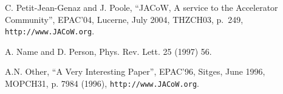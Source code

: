 \documentclass{JAC2003}
\begin{document}
\begin{thebibliography}{9}   %

C. Petit-Jean-Genaz and J. Poole, ``JACoW, A service to the Accelerator Community'',
EPAC'04, Lucerne, July 2004, THZCH03,  p.~249, \texttt{http://www.JACoW.org}.

 A. Name and D. Person, Phys. Rev. Lett. 25 (1997) 56.

A.N. Other, ``A Very Interesting Paper'', EPAC'96, Sitges, June 1996, MOPCH31, p. 7984 (1996),
\texttt{http://www.JACoW.org}.


\end{thebibliography}
\end{document}
